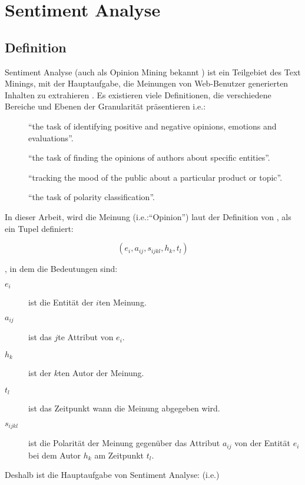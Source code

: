 \section{Sentiment Analyse}
\subsection{Definition} \label{SAdefinition}
Sentiment Analyse (auch als Opinion Mining bekannt \citep{tapia2014twitter,duenassentiment}) ist ein Teilgebiet des Text Minings, mit der Hauptaufgabe, die Meinungen von Web-Benutzer generierten Inhalten zu extrahieren \citep{Balazs2016}. Es existieren viele Definitionen, die verschiedene Bereiche und Ebenen der Granularität präsentieren \ac{i.e.}:
\begin{description}
	\item[\citet{Wilson:2005:RCP:1220575.1220619}] ``the task of identifying positive and negative opinions, emotions and evaluations''.
	\item[\citet{Feldman:2013:TAS:2436256.2436274}] ``the task of finding the opinions of authors about specific entities''.
	\item[\citet{vinodhini2012sentiment}] ``tracking the mood of the public about a particular product or topic''.
	\item[\citet{6468032}] ``the task of polarity classification''.
\end{description}
In dieser Arbeit, wird die Meinung (\ac{i.e.}:``Opinion'') laut der Definition von \citet{liu2010sentiment}, als ein Tupel definiert:

$$(e_i, a_{ij}, s_{ijkl}, h_k, t_l)$$

, in dem die Bedeutungen sind:
\begin{description}
	\item[$e_i$] ist die Entität der $i$ten Meinung.
	\item[$a_{ij}$] ist das $j$te Attribut von $e_i$.
	\item[$h_k$] ist der $k$ten Autor der Meinung.
	\item[$t_l$] ist das Zeitpunkt wann die Meinung abgegeben wird.
	\item[$s_{ijkl}$] ist die Polarität der Meinung gegenüber das Attribut $a_{ij}$ von der Entität $e_i$ bei dem Autor $h_k$ am Zeitpunkt $t_l$.
\end{description}
Deshalb ist die Hauptaufgabe von Sentiment Analyse: (\ac{i.e.})

